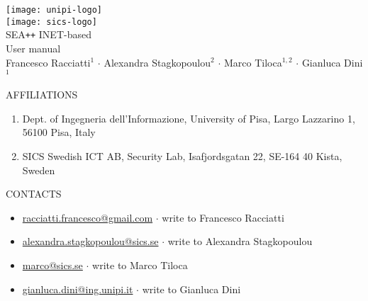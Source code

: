 \begin{minipage}[c]{0.9\textwidth}
\footnotesize
\vspace{.05\textheight}
\begin{center}
\texttt{[image: unipi-logo]}\\[2\baselineskip]
\texttt{[image: sics-logo]}\\[6\baselineskip]

SEA\texttt{++} INET-based \\[0.2\baselineskip]
User manual \\[1\baselineskip]
{
Francesco Racciatti$^1$ $\cdot$ Alexandra Stagkopoulou$^2$ $\cdot$ Marco Tiloca$^{1,2}$ $\cdot$ Gianluca Dini$^1$\\[2\baselineskip]
}
\end{center}

\vspace{.2\textheight}
AFFILIATIONS
%
\begin{enumerate}
\item Dept. of Ingegneria dell'Informazione, University of Pisa, Largo Lazzarino 1, 56100 Pisa, Italy
\item SICS Swedish ICT AB, Security Lab, Isafjordsgatan 22, SE-164 40 Kista, Sweden
\end{enumerate}


\vspace{.05\textheight}
CONTACTS
%
\begin{itemize}
\item \href{mailto:racciatti.francesco@gmail.com}{racciatti.francesco@gmail.com} $\cdot$ write to Francesco Racciatti
\item \href{mailto:alexandra.stagkopoulou@sics.se}{alexandra.stagkopoulou@sics.se} $\cdot$ write to Alexandra Stagkopoulou
\item \href{mailto:marco@sics.se}{marco@sics.se} $\cdot$ write to Marco Tiloca
\item \href{mailto:gianluca.dini@ing.unipi.it}{gianluca.dini@ing.unipi.it} $\cdot$ write to Gianluca Dini
\end{itemize}
%
\end{minipage}
\cleardoublepage
